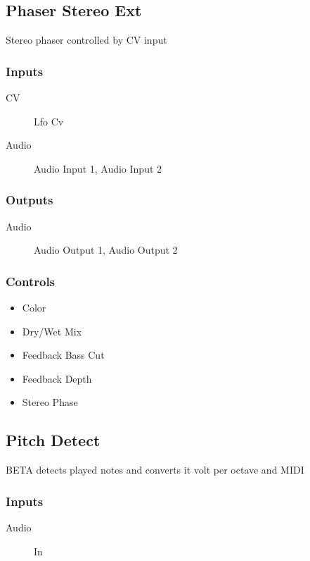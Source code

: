 \subsection{Phaser Stereo Ext}

Stereo phaser controlled by CV input



\subsubsection{Inputs}
\begin{description}
\item [CV] Lfo Cv
\item [Audio] Audio Input 1, Audio Input 2
\end{description}

\subsubsection{Outputs}
\begin{description}
\item [Audio] Audio Output 1, Audio Output 2
\end{description}

\subsubsection{Controls}
\begin{itemize}
\item Color
\item Dry/Wet Mix
\item Feedback Bass Cut
\item Feedback Depth
\item Stereo Phase
\end{itemize}

\subsection{Pitch Detect}

BETA detects played notes and converts it volt per octave and MIDI



\subsubsection{Inputs}
\begin{description}
\item [Audio] In
\end{description}

